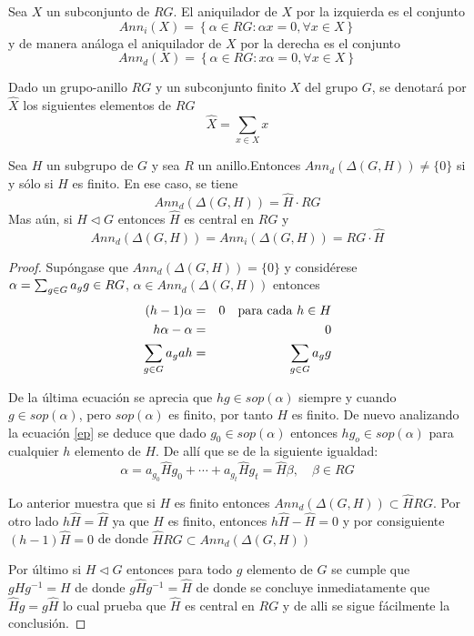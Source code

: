 \begin{definicion}
Sea $X$ un subconjunto de $RG$. El aniquilador de $X$ por la izquierda es el conjunto
\[ Ann_{i}(X) = \left\{ \alpha \in RG : \alpha x = 0, \forall x \in X \right\} \]
y de manera análoga el aniquilador de $X$ por la derecha es el conjunto
\[ Ann_{d}(X) = \left\{ \alpha \in RG : x\alpha  = 0, \forall x \in X \right\} \]

\end{definicion}

\begin{definicion}
Dado un grupo-anillo $RG$ y un subconjunto finito $X$ del grupo $G$, se denotará por $\hat{X}$ los siguientes elementos de $RG$
\[\hat{X} = \sum_{x \in X}x\] 
\end{definicion}

\begin{lema}
Sea $H$ un subgrupo de $G$ y sea $R$ un anillo.Entonces $Ann_{d}(\Delta(G,H)) \neq \{ 0\}$ si y sólo si $H$ es finito. En ese caso, se tiene
$$Ann_d(\Delta(G,H)) = \hat{H} \cdot RG $$
Mas aún, si $H \lhd G$ entonces $\hat{H}$ es central en $RG$ y 
\[Ann_d(\Delta(G,H)) = Ann_i(\Delta(G,H)) = RG \cdot \hat{H}\]
\end{lema}

\begin{proof}
Supóngase que $Ann_d(\Delta(G,H)) = \{ 0\}$ y considérese $\alpha = \sum_{g \in G} a_{g} g \in RG$, $\alpha \in Ann_d(\Delta(G,H))$ entonces
\begin{eqnarray}
(h-1)\alpha &=& 0  \quad \mbox{para cada } h \in H  \\
h\alpha -\alpha &=&  0  \\
\sum_{g \in G} a_gah &=& \sum_{g \in G} a_{g} g \label{ep}
\end{eqnarray}

De la última ecuación se aprecia que $hg \in sop(\alpha)$ siempre y cuando $g \in sop(\alpha)$, pero $sop(\alpha)$ es finito, por tanto $H$ es finito.
De nuevo analizando la ecuación \ref{ep} se deduce que dado $g_0 \in sop(\alpha)$ entonces $hg_o \in sop(\alpha)$ para cualquier $h$ elemento de $H$. De allí que se de la siguiente igualdad:
\[ \alpha = a_{g_0}\hat{H}g_0 + \cdots + a_{g_t}\hat{H}g_t = \hat{H}\beta, \quad \beta \in RG \]

Lo anterior muestra que si $H$ es finito entonces $Ann_d(\Delta(G,H))\subset \hat{H}RG$. Por otro lado $h\hat{H} = \hat{H}$ ya que $H$ es finito, entonces $h\hat{H} -\hat{H} = 0$ y por consiguiente $(h-1)\hat{H} = 0$ de donde $\hat{H}RG \subset Ann_d(\Delta(G,H))  $

Por último si $H \lhd G$ entonces para todo $g$ elemento de $G$ se cumple que $gHg^{-1} = H$ de donde $g\hat{H}g^{-1} = \hat{H}$ de donde se concluye inmediatamente que $\hat{H}g = g\hat{H}$ lo cual prueba que $\hat{H}$ es central en $RG$ y de alli se sigue fácilmente la conclusión. \qedhere
\end{proof}

